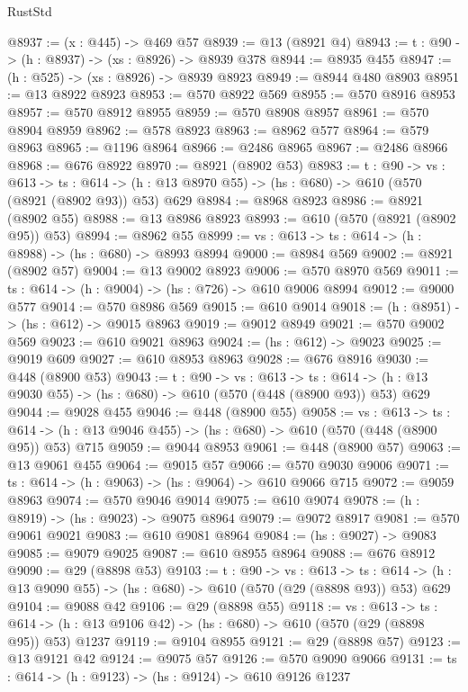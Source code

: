 \begin{lexlean}{RustStd}
\begin{coremodule}
@8937 := (x : @445) -> @469 @57
@8939 := @13 (@8921 @4)
@8943 := {t : @90} -> (h : @8937) -> (xs : @8926) -> @8939 @378
@8944 := @8935 @455
@8947 := (h : @525) -> (xs : @8926) -> @8939 @8923
@8949 := @8944 @480 @8903
@8951 := @13 @8922 @8923
@8953 := @570 @8922 @569
@8955 := @570 @8916 @8953
@8957 := @570 @8912 @8955
@8959 := @570 @8908 @8957
@8961 := @570 @8904 @8959
@8962 := @578 @8923
@8963 := @8962 @577
@8964 := @579 @8963
@8965 := @1196 @8964
@8966 := @2486 @8965
@8967 := @2486 @8966
@8968 := @676 @8922
@8970 := @8921 (@8902 @53)
@8983 := {t : @90} ->
  {vs : @613} ->
  {ts : @614} -> (h : @13 @8970 @55) -> (hs : @680) -> @610 (@570 (@8921 (@8902 @93)) @53) @629
@8984 := @8968 @8923
@8986 := @8921 (@8902 @55)
@8988 := @13 @8986 @8923
@8993 := @610 (@570 (@8921 (@8902 @95)) @53)
@8994 := @8962 @55
@8999 := {vs : @613} -> {ts : @614} -> (h : @8988) -> (hs : @680) -> @8993 @8994
@9000 := @8984 @569
@9002 := @8921 (@8902 @57)
@9004 := @13 @9002 @8923
@9006 := @570 @8970 @569
@9011 := {ts : @614} -> (h : @9004) -> (hs : @726) -> @610 @9006 @8994
@9012 := @9000 @577
@9014 := @570 @8986 @569
@9015 := @610 @9014
@9018 := (h : @8951) -> (hs : @612) -> @9015 @8963
@9019 := @9012 @8949
@9021 := @570 @9002 @569
@9023 := @610 @9021 @8963
@9024 := (hs : @612) -> @9023
@9025 := @9019 @609
@9027 := @610 @8953 @8963
@9028 := @676 @8916
@9030 := @448 (@8900 @53)
@9043 := {t : @90} ->
  {vs : @613} ->
  {ts : @614} -> (h : @13 @9030 @55) -> (hs : @680) -> @610 (@570 (@448 (@8900 @93)) @53) @629
@9044 := @9028 @455
@9046 := @448 (@8900 @55)
@9058 := {vs : @613} ->
  {ts : @614} -> (h : @13 @9046 @455) -> (hs : @680) -> @610 (@570 (@448 (@8900 @95)) @53) @715
@9059 := @9044 @8953
@9061 := @448 (@8900 @57)
@9063 := @13 @9061 @455
@9064 := @9015 @57
@9066 := @570 @9030 @9006
@9071 := {ts : @614} -> (h : @9063) -> (hs : @9064) -> @610 @9066 @715
@9072 := @9059 @8963
@9074 := @570 @9046 @9014
@9075 := @610 @9074
@9078 := (h : @8919) -> (hs : @9023) -> @9075 @8964
@9079 := @9072 @8917
@9081 := @570 @9061 @9021
@9083 := @610 @9081 @8964
@9084 := (hs : @9027) -> @9083
@9085 := @9079 @9025
@9087 := @610 @8955 @8964
@9088 := @676 @8912
@9090 := @29 (@8898 @53)
@9103 := {t : @90} ->
  {vs : @613} ->
  {ts : @614} -> (h : @13 @9090 @55) -> (hs : @680) -> @610 (@570 (@29 (@8898 @93)) @53) @629
@9104 := @9088 @42
@9106 := @29 (@8898 @55)
@9118 := {vs : @613} ->
  {ts : @614} -> (h : @13 @9106 @42) -> (hs : @680) -> @610 (@570 (@29 (@8898 @95)) @53) @1237
@9119 := @9104 @8955
@9121 := @29 (@8898 @57)
@9123 := @13 @9121 @42
@9124 := @9075 @57
@9126 := @570 @9090 @9066
@9131 := {ts : @614} -> (h : @9123) -> (hs : @9124) -> @610 @9126 @1237

\end{coremodule}
\end{lexlean}
